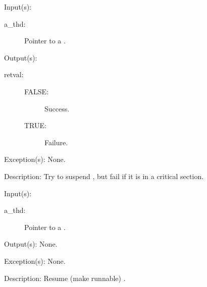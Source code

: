 \begin{capi}
	\begin{capilist}
	\item[Input(s): ]
		\begin{description}\item[]
		\item[a\_thd: ]
			Pointer to a .
		\end{description}
	\item[Output(s): ]
		\begin{description}\item[]
		\item[retval: ]
			\begin{description}\item[]
			\item[FALSE: ]
				Success.
			\item[TRUE: ]
				Failure.
			\end{description}
		\end{description}
	\item[Exception(s): ] None.
	\item[Description: ]
		Try to suspend , but fail if it is in a critical
		section.
	\end{capilist}
\label{thd_resume}
	\begin{capilist}
	\item[Input(s): ]
		\begin{description}\item[]
		\item[a\_thd: ]
			Pointer to a \classname{thd}.
		\end{description}
	\item[Output(s): ] None.
	\item[Exception(s): ] None.
	\item[Description: ]
		Resume (make runnable) \classname{a\_thd}.
	\end{capilist}
\end{capi}
